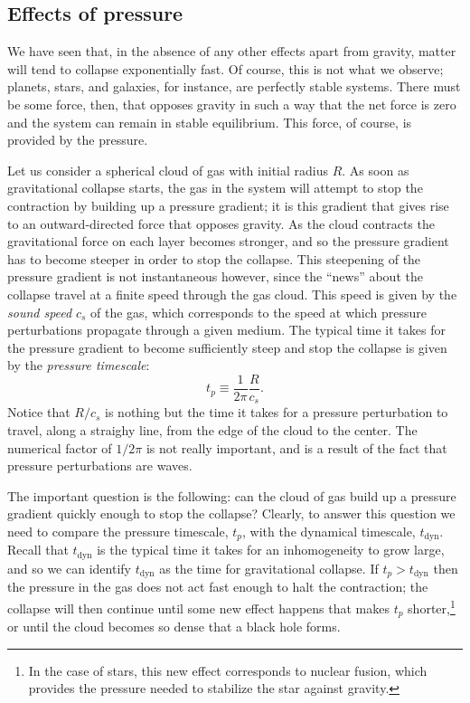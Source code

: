 \documentclass[11pt, a4paper,oneside,openright]{book}
\numberwithin{equation}{section}
\begin{document}
\subsection{Effects of pressure}

We have seen that, in the absence of any other effects apart from gravity, matter will tend to collapse exponentially fast. Of course, this is not what we observe; planets, stars, and galaxies, for instance, are perfectly stable systems. There must be some force, then, that opposes gravity in such a way that the net force is zero and the system can remain in stable equilibrium. This force, of course, is provided by the pressure.

Let us consider a spherical cloud of gas with initial radius $R$. As soon as gravitational collapse starts, the gas in the system will attempt to stop the contraction by building up a pressure gradient; it is this gradient that gives rise to an outward-directed force that opposes gravity. As the cloud contracts the gravitational force on each layer becomes stronger, and so the pressure gradient has to become steeper in order to stop the collapse. This steepening of the pressure gradient is not instantaneous however, since the ``news'' about the collapse travel at a finite speed through the gas cloud. This speed is given by the {\it sound speed} $c_s$ of the gas, which corresponds to the speed at which pressure perturbations propagate through a given medium. The typical time it takes for the pressure gradient to become sufficiently steep and stop the collapse is given by the {\it pressure timescale}:
\begin{equation}
t_p\equiv \frac{1}{2\pi}\frac{R}{c_s}.
\end{equation}
Notice that $R/c_s$ is nothing but the time it takes for a pressure perturbation to travel, along a straighy line, from the edge of the cloud to the center. The numerical factor of $1/2\pi$ is not really important, and is a result of the fact that pressure perturbations are waves.

The important question is the following: can the cloud of gas build up a pressure gradient quickly enough to stop the collapse? Clearly, to answer this question we need to compare the pressure timescale, $t_p$, with the dynamical timescale, $t_{\mathrm{dyn}}$. Recall that $t_{\mathrm{dyn}}$ is the typical time it takes for an inhomogeneity to grow large, and so we can identify $t_{\mathrm{dyn}}$ as the time for gravitational collapse. If $t_p>t_{\mathrm{dyn}}$ then the pressure in the gas does not act fast enough to halt the contraction; the collapse will then continue until some new effect happens that makes $t_p$ shorter,\footnote{In the case of stars, this new effect corresponds to nuclear fusion, which provides the pressure needed to stabilize the star against gravity.} or until the cloud becomes so dense that a black hole forms.
\end{document}
